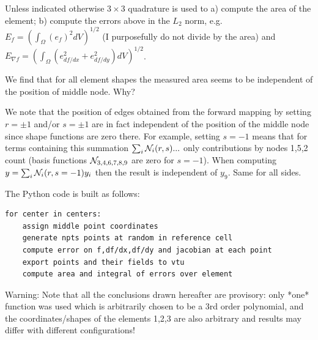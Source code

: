 Unless indicated otherwise $3 \times 3$ quadrature is used to a) compute
the area of the element; b) compute the errors above in the $L_2$ norm,
e.g. $E_f=\left(\int_\Omega (e_f)^2 dV \right)^{1/2}$ (I purposefully do not 
divide by the area) and $E_{\nabla f}=\left(\int_\Omega (e_{df/dx}^2+e_{df/dy}^2) dV \right)^{1/2}$.

We find that for all element shapes the measured area seems to be independent 
of the position of middle node. Why?

We note that the position of edges obtained from the 
forward mapping by setting $r=\pm 1$ and/or $s=\pm 1$ are in fact
independent of the position of the middle node since shape functions are zero there.
For example, setting $s=-1$ means that for terms containing 
this summation $\sum_i {\mathcal{N}}_i(r,s) ...$  only contributions by nodes
1,5,2 count (basis functions ${\mathcal{N}}_{3,4,6,7,8,9}$ are zero for $s=-1$).
When computing $y=\sum_i {\mathcal{N}}_i(r,s=-1) y_i$ then the result is 
independent of $y_9$. Same for all sides.
 
\vspace{.5cm}

The Python code is built as follows:
\begin{verbatim}
for center in centers:
    assign middle point coordinates
    generate npts points at random in reference cell
    compute error on f,df/dx,df/dy and jacobian at each point
    export points and their fields to vtu
    compute area and integral of errors over element
\end{verbatim}

Warning: Note that all the conclusions drawn hereafter are provisory:
only *one* function was used which is arbitrarily chosen to be a 3rd order polynomial,
and the coordinates/shapes of the elements 1,2,3 are also arbitrary and results
may differ with different configurations!



\newpage

